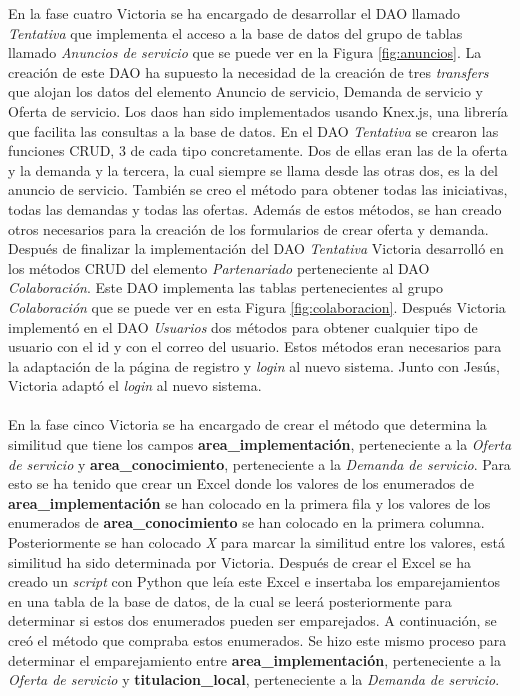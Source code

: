\documentclass[11pt]{book}
\begin{document}
	En la fase cuatro Victoria se ha encargado de desarrollar el DAO llamado \textit{Tentativa} que implementa el acceso a la base de datos del grupo de tablas llamado \textit{Anuncios de servicio} que se puede ver en la Figura \ref{fig:anuncios}. La creación de este DAO ha supuesto la necesidad de la creación de tres \textit{transfers} que alojan los datos del elemento Anuncio de servicio, Demanda de servicio y Oferta de servicio. Los daos han sido implementados usando Knex.js, una librería que facilita las consultas a la base de datos. En el DAO \textit{Tentativa} se crearon las funciones CRUD, 3 de cada tipo concretamente. Dos de ellas eran las de la oferta y la demanda y la tercera, la cual siempre se llama desde las otras dos, es la del anuncio de servicio. También se creo el método para obtener todas las iniciativas, todas las demandas y todas las ofertas. Además de estos métodos, se han creado otros necesarios para la creación de los formularios de crear oferta y demanda. \\
	Después de finalizar la implementación del DAO \textit{Tentativa} Victoria desarrolló en los métodos CRUD del elemento \textit{Partenariado} perteneciente al DAO \textit{Colaboración}. Este DAO implementa las tablas pertenecientes al grupo \textit{Colaboración} que se puede ver en esta Figura \ref{fig:colaboracion}.
	Después Victoria implementó en el DAO \textit{Usuarios} dos métodos para obtener cualquier tipo de usuario con el id y con el correo del usuario. Estos métodos eran necesarios para la adaptación de la página de registro y \textit{login} al nuevo sistema. Junto con Jesús, Victoria adaptó el \textit{login} al nuevo sistema.\\\\
	En la fase cinco Victoria se ha encargado de crear el método que determina la similitud que tiene los campos \textbf{area\_implementación}, perteneciente a la \textit{Oferta de servicio} y \textbf{area\_conocimiento}, perteneciente a la \textit{Demanda de servicio}. Para esto se ha tenido que crear un Excel donde los valores de los enumerados de \textbf{area\_implementación} se han colocado en la primera fila y los valores de los enumerados de  \textbf{area\_conocimiento} se han colocado en la primera columna. Posteriormente se han colocado \textit{X} para marcar la similitud entre los valores, está similitud ha sido determinada por Victoria. Después de crear el Excel se ha creado un \textit{script} con Python que leía este Excel e insertaba los emparejamientos en una tabla de la base de datos, de la cual se leerá posteriormente para determinar si estos dos enumerados pueden ser emparejados. A continuación, se creó el método que compraba estos enumerados. Se hizo este mismo proceso para determinar el emparejamiento entre \textbf{area\_implementación}, perteneciente a la \textit{Oferta de servicio} y \textbf{titulacion\_local}, perteneciente a la \textit{Demanda de servicio}.\\
\end{document}
